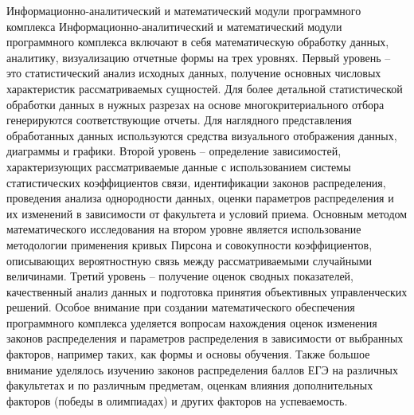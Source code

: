 \documentclass[12pt]{article}
\begin{document}
              Информационно-аналитический и математический модули программного комплекса
              Информационно-аналитический и математический модули программного комплекса включают в себя математическую обработку данных, аналитику, визуализацию отчетные формы на трех уровнях. Первый уровень – это статистический анализ  исходных данных, получение основных числовых характеристик рассматриваемых сущностей.   Для более детальной статистической обработки данных в нужных разрезах на основе многокритериального отбора генерируются соответствующие отчеты. Для наглядного представления обработанных данных используются средства визуального отображения данных, диаграммы и графики.
              Второй уровень – определение зависимостей, характеризующих   рассматриваемые данные с использованием системы статистических коэффициентов связи, идентификации законов распределения,  проведения анализа однородности данных, оценки параметров распределения и их изменений в зависимости от факультета и условий приема. Основным методом математического исследования на втором уровне является использование методологии применения кривых Пирсона и совокупности коэффициентов, описывающих  вероятностную связь между рассматриваемыми случайными величинами. 
              Третий уровень – получение оценок сводных показателей, качественный анализ данных и подготовка принятия объективных управленческих решений.
              Особое внимание при создании математического обеспечения программного комплекса уделяется вопросам нахождения оценок изменения законов распределения и параметров распределения в зависимости от выбранных факторов, например таких, как формы  и основы обучения. Также большое внимание уделялось изучению законов  распределения баллов ЕГЭ на различных факультетах и по различным предметам, оценкам влияния дополнительных факторов (победы в олимпиадах) и других факторов  на успеваемость.
\end{document}

